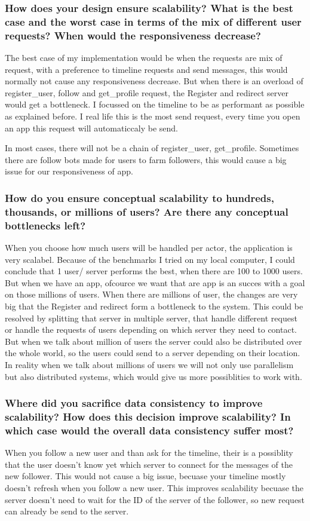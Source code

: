 \documentclass[a4paper]{article}
\begin{document}
\subsubsection{How does your design ensure scalability? What is the best case and the worst case in
terms of the mix of different user requests? When would the responsiveness decrease?}
The best case of my implementation would be when the requests are mix of request, with a preference to timeline requests and send messages, this would normally not cause any responsiveness decrease. But when there is an overload of register\_user, follow and get\_profile request, the Register and redirect server would get a bottleneck. I focussed on the timeline to be as performant as possible as explained before. I real life this is the most send request, every time you open an app this request will automaticcaly be send.

In most cases, there will not be a chain of register\_user, get\_profile. Sometimes there are follow bots made for users to farm followers, this would cause a big issue for our responsiveness of app. 

\subsubsection{How do you ensure conceptual scalability to hundreds, thousands, or millions of users?
Are there any conceptual bottlenecks left?}

When you choose how much users will be handled per actor, the application is very scalabel. Because of the benchmarks I tried on my local computer, I could conclude that 1 user/ server performs the best, when there are 100 to 1000 users. But when we have an app, ofcource we want that are app is an succes with a goal on those millions of users. When there are millions of user, the changes are very big that the Register and redirect form a bottleneck to the system. This could be resolved by splitting that server in multiple server, that handle different request or handle the requests of users depending on which server they need to contact. But when we talk about million of users the server could also be distributed over the whole world, so the users could send to a server depending on their location. In reality when we talk about millions of users we will not only use parallelism but also distributed systems, which would give us more possiblities to work with.

\subsubsection{ Where did you sacrifice data consistency to improve scalability? How does this decision improve scalability? In which case would the overall data consistency suffer most? }
When you follow a new user and than ask for the timeline, their is a possiblity that the user doesn't know yet which server to connect for the messages of the new follower. This would not cause a big issue, becuase your timeline mostly doesn't refresh when you follow a new user. This improves scalability becuase the server doesn't need to wait for the ID of the server of the follower, so new request can already be send to the server. 
\end{document}

